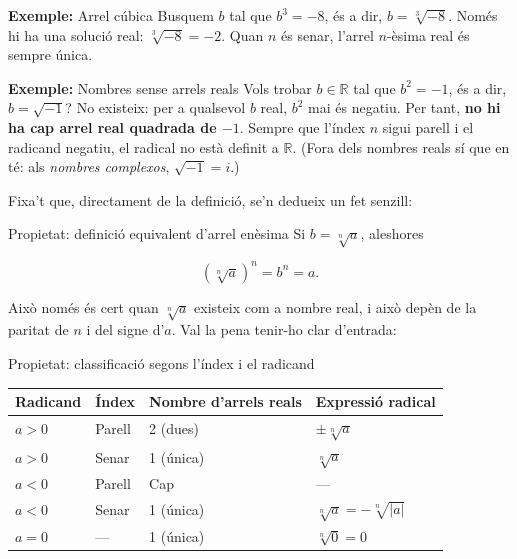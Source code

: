 \begin{exemple}{\textbf{Exemple:} Arrel cúbica}
Busquem $b$ tal que $b^3=-8$, és a dir, $b=\sqrt[3]{-8}$. Només hi ha una solució real: $\sqrt[3]{-8}=-2$. Quan $n$ és senar, l'arrel $n$-èsima real és sempre única.
\end{exemple}

\begin{exemple}{\textbf{Exemple:} Nombres sense arrels reals}
Vols trobar $b \in \mathbb{R}$ tal que $b^2=-1$, és a dir, $b=\sqrt{-1}$? No existeix: per a qualsevol $b$ real, $b^2$ mai és negatiu. Per tant, \textbf{no hi ha cap arrel real quadrada de $-1$}. Sempre que l'índex $n$ sigui parell i el radicand negatiu, el radical no està definit a $\mathbb{R}$. (Fora dels nombres reals sí que en té: als \emph{nombres complexos}, $\sqrt{-1}=i$.)
\end{exemple}

Fixa't que, directament de la definició, se'n dedueix un fet senzill:

\begin{propietat}{Propietat: definició equivalent d'arrel enèsima}
Si $b = \sqrt[n]{a}$, aleshores

\[
\left(\sqrt[n]{a}\right)^n = b^n = a.
\]
\end{propietat}

Això només és cert quan $\sqrt[n]{a}$ existeix com a nombre real, i això depèn de la paritat de $n$ i del signe d'$a$. Val la pena tenir-ho clar d'entrada:

\begin{propietat}{Propietat: classificació segons l'índex i el radicand}
\begin{center}
\begin{tabular}{llll}
\toprule
\textbf{Radicand} & \textbf{Índex} & \textbf{Nombre d'arrels reals} & \textbf{Expressió radical} \\
\midrule
$a>0$ & Parell & 2 (dues) & $\pm \sqrt[n]{a}$ \\
$a>0$ & Senar & 1 (única) & $\sqrt[n]{a}$ \\
$a<0$ & Parell & Cap & — \\
$a<0$ & Senar & 1 (única) & $\sqrt[n]{a} = -\sqrt[n]{\lvert a\rvert}$ \\
$a=0$ & — & 1 (única) & $\sqrt[n]{0}=0$ \\
\bottomrule
\end{tabular}
\end{center}
\end{propietat}


